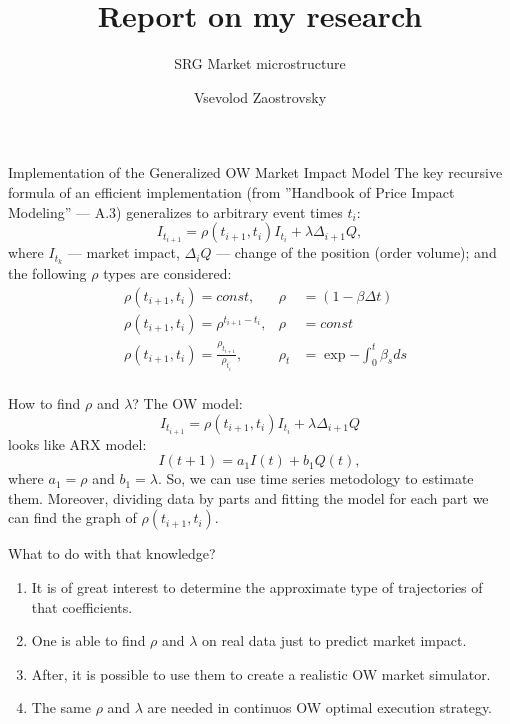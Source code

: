 \documentclass[aspectratio=169]{beamer}
\title{Report on my research}
\subtitle{SRG Market microstructure}
\author{Vsevolod Zaostrovsky}
\institute{Vega Institute Foundation}
\begin{document}
\maketitle

\begin{frame}{Implementation of the Generalized OW Market Impact Model}
    The key recursive formula of an efficient implementation (from ''Handbook of Price
    Impact Modeling'' --- A.3) generalizes to arbitrary event times $t_i$:
    \begin{equation}
        I_{t_{i+1}} = \rho (t_{i + 1}, t_i) I_{t_i} + \lambda \Delta_{i + 1} Q,
    \end{equation}
    where $I_{t_k}$ --- market impact, $\Delta_{i} Q$ --- change of the position (order volume); and the following $\rho$ types are considered:
    \begin{align*}
        & \rho (t_{i + 1}, t_i) = const,                                & \rho   &= (1 - \beta \Delta t) \\
        & \rho  (t_{i + 1}, t_i) = \rho ^{t_{i + 1} - t_i},             & \rho   &= const \\
        & \rho  (t_{i + 1}, t_i) = \frac{\rho_{t_{i+1}}}{\rho_{t_{i}}}, & \rho_t &= \exp{- \int_0^t \beta_s ds} \\
    \end{align*}
\end{frame}

\begin{frame}{How to find $\rho$ and $\lambda$?}
    The OW model:
    \begin{equation}
        I_{t_{i+1}} = \rho (t_{i + 1}, t_i) I_{t_i} + \lambda \Delta_{i + 1} Q
    \end{equation}
    looks like ARX model:
    \begin{equation*}
        I(t + 1) = a_1 I(t) + b_1 Q(t),
    \end{equation*}
    where $a_1 = \rho$ and $b_1 = \lambda$. So, we can use time series metodology to estimate them.
    Moreover, dividing data by parts and fitting the model for each part we can find the graph of $\rho (t_{i + 1}, t_i)$.
\end{frame}

\begin{frame}{What to do with that knowledge?}
    \begin{enumerate}
        \item It is of great interest to determine the approximate type of trajectories of that coefficients.
        \item One is able to find $\rho$ and $\lambda$ on real data just to predict market impact.
        \item After, it is possible to use them to create a realistic OW market simulator.
        \item The same $\rho$ and $\lambda$ are needed in continuos OW optimal execution strategy. 
    \end{enumerate}
\end{frame}
\end{document}
